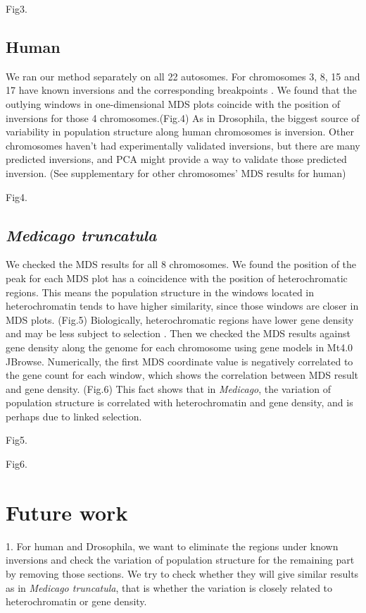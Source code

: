 \documentclass[11pt, oneside]{article}   	%
\begin{document}
{Fig3.

\subsection{Human}
We ran our method separately on all 22 autosomes. For chromosomes 3, 8, 15 and 17 have known inversions and the corresponding breakpoints \cite{key12}. We found that the outlying windows in one-dimensional MDS plots coincide with the position of inversions for those 4 chromosomes.(Fig.4) As in Drosophila, the biggest source of variability in population structure along human chromosomes is inversion. Other chromosomes haven't had experimentally validated inversions, but there are many predicted inversions, and PCA might provide a way to validate those predicted inversion. \cite{key13} (See supplementary for other chromosomes' MDS results for human)

Fig4.

\subsection{\textit{Medicago truncatula}}
We checked the MDS results for all 8 chromosomes. We found the position of the peak for each MDS plot has a coincidence with the position of heterochromatic regions. This means the population structure in the windows located in heterochromatin tends to have higher similarity, since those windows are closer in MDS plots. (Fig.5) Biologically,
heterochromatic regions have lower gene density and may be less subject to selection \cite{key15,key16}. Then we checked the MDS results against gene density along the genome for each chromosome using gene models in Mt4.0 JBrowse. Numerically, the first MDS coordinate value is negatively correlated to the gene count for each window, which shows the correlation between MDS result and gene density. (Fig.6) This fact shows that in \textit{Medicago}, the variation of population structure is correlated with heterochromatin and gene density, and is perhaps due to linked selection.

Fig5.

Fig6.

\section{Future work}
1. For human and Drosophila, we want to eliminate the regions under known inversions and check the variation of population structure for the remaining part by removing those sections. We try to check whether they will give similar results as in \textit{Medicago truncatula}, that is whether the variation is closely related to heterochromatin or gene density.

}
\end{document}

